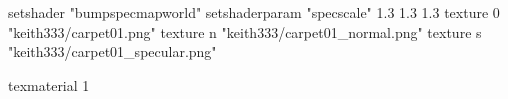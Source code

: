 setshader "bumpspecmapworld"
setshaderparam "specscale" 1.3 1.3 1.3
   texture 0 "keith333/carpet01.png"
   texture n "keith333/carpet01_normal.png"
   texture s "keith333/carpet01_specular.png"

texmaterial 1
